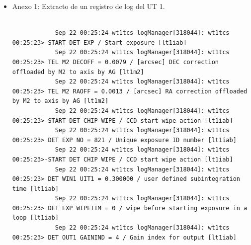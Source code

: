 
\begin{itemize}
    \item Anexo 1: Extracto de un registro de log del UT 1.
        \begin{listing}[!ht]
            \caption{\label{myverbatim:ejemplo_registro} Ejemplos de fuerzas aplicadas}
            \begin{verbatim}
            
            Sep 22 00:25:24 wt1tcs logManager[318044]: wt1tcs  00:25:23>-START DET EXP / Start exposure [lt1iab]
            Sep 22 00:25:24 wt1tcs logManager[318044]: wt1tcs  00:25:23> TEL M2 DECOFF = 0.0079 / [arcsec] DEC correction offloaded by M2 to axis by AG [lt1m2]
            Sep 22 00:25:24 wt1tcs logManager[318044]: wt1tcs  00:25:23> TEL M2 RAOFF = 0.0013 / [arcsec] RA correction offloaded by M2 to axis by AG [lt1m2]
            Sep 22 00:25:24 wt1tcs logManager[318044]: wt1tcs  00:25:23>-START DET CHIP WIPE / CCD start wipe action [lt1iab]
            Sep 22 00:25:24 wt1tcs logManager[318044]: wt1tcs  00:25:23> DET EXP NO = 821 / Unique exposure ID number [lt1iab]
            Sep 22 00:25:24 wt1tcs logManager[318044]: wt1tcs  00:25:23>-START DET CHIP WIPE / CCD start wipe action [lt1iab]
            Sep 22 00:25:24 wt1tcs logManager[318044]: wt1tcs  00:25:23> DET WIN1 UIT1 = 0.300000 / user defined subintegration time [lt1iab]
            Sep 22 00:25:24 wt1tcs logManager[318044]: wt1tcs  00:25:23> DET EXP WIPETIM = 0 / wipe before starting exposure in a loop [lt1iab]
            Sep 22 00:25:24 wt1tcs logManager[318044]: wt1tcs  00:25:23> DET OUT1 GAININD = 4 / Gain index for output [lt1iab]
    
            \end{verbatim}
        \end{listing}

\end{itemize}


